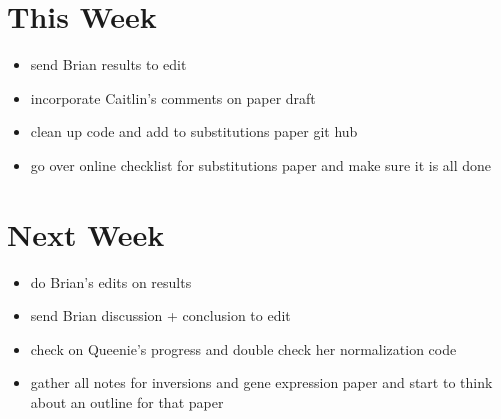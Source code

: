 \documentclass[12pt]{article}
\begin{document}

\section*{This Week}
%
\begin{itemize}
	\item send Brian results to edit
	\item incorporate Caitlin's comments on paper draft
	\item clean up code and add to substitutions paper git hub
	\item go over online checklist for substitutions paper and make sure it is all done
\end{itemize}


\section*{Next Week}
\begin{itemize}
	\item do Brian's edits on results
	\item send Brian discussion + conclusion to edit
	\item check on Queenie's progress and double check her normalization code
	\item gather all notes for inversions and gene expression paper and start to think about an outline for that paper
\end{itemize}

\newpage
\end{document}
